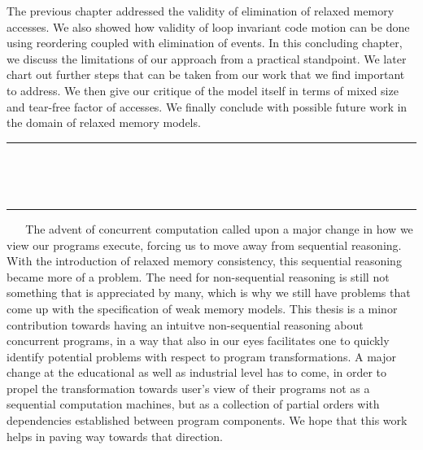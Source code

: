 The previous chapter addressed the validity of elimination of relaxed memory accesses. 
We also showed how validity of loop invariant code motion can be done using reordering coupled with elimination of events. 
In this concluding chapter, we discuss the limitations of our approach from a practical standpoint.
We later chart out further steps that can be taken from our work that we find important to address.
We then give our critique of the model itself in terms of mixed size and tear-free factor of accesses. 
We finally conclude with possible future work in the domain of relaxed memory models.
\ \newline
\ \newline  
\hrule 
\ \newline 
\ \newline 











\ \newline
\ \newline  
\hrule 
\ \newline 
\ \newline 
The advent of concurrent computation called upon a major change in how we view our programs execute, forcing us to move away from sequential reasoning.
With the introduction of relaxed memory consistency, this sequential reasoning became more of a problem.
The need for non-sequential reasoning is still not something that is appreciated by many, which is why we still have problems that come up with the specification of weak memory models.
This thesis is a minor contribution towards having an intuitve non-sequential reasoning about concurrent programs, in a way that also in our eyes facilitates one to quickly identify potential problems with respect to program transformations. 
A major change at the educational as well as industrial level has to come, in order to propel the transformation towards user's view of their programs not as a sequential computation machines, but as a collection of partial orders with dependencies established between program components.
We hope that this work helps in paving way towards that direction.
